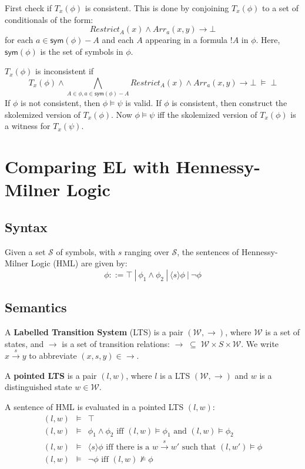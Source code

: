 \documentclass[smallextended]{svjour3}       %
\numberwithin{subcase}{mycase}
\def\fOr {\ | \ }
\begin{document}
First check if $T_x(\phi)$ is consistent.
This is done by conjoining $T_x(\phi)$ to a set of conditionals of the form:
\[
Restrict_A(x) \land Arr_a(x,y) \rightarrow \bot
\]
for each $a \in \mathsf{sym}(\phi)-A$ and each $A$ appearing in a formula $!A$ in $\phi$.
Here, $\mathsf{sym}(\phi)$ is the set of symbols in $\phi$.

$T_x(\phi)$ is inconsistent if 
\[
T_x(\phi) \land \bigwedge_{A \in \phi, a \in\mathsf{sym}(\phi)-A} Restrict_A(x) \land Arr_a(x,y) \rightarrow \bot \; \models \; \bot
\]
If $\phi$ is not consistent, then $\phi \models \psi$ is valid.
If $\phi$ is consistent, then construct the skolemized version of $T_x(\phi)$. 
Now $\phi \models \psi$ iff the skolemized version of  $T_x(\phi)$ is a witness for $T_x(\psi)$. 

\section{Comparing EL with Hennessy-Milner Logic}
\subsection{Syntax}
Given a set $\mathcal{S}$ of symbols, with $s$ ranging over $\mathcal{S}$, the sentences of Hennessy-Milner Logic (HML) are given by:
\[
\phi ::= \top \fOr \phi_1 \land \phi_2 \fOr \langle s \rangle \phi \fOr \neg \phi 
\]
\subsection{Semantics}
A {\bf Labelled Transition System} (LTS) is a pair $(\mathcal{W}, \rightarrow)$, where $\mathcal{W}$ is a set of states, and $\rightarrow$ is a set of transition relations: $\rightarrow \; \subseteq \; \mathcal{W} \times S \times \mathcal{W}$.
We write $x \xrightarrow{s} y$ to abbreviate $(x,s,y) \in \rightarrow$.

A {\bf pointed LTS} is a pair $(l, w)$, where $l$ is a LTS $(\mathcal{W}, \rightarrow)$ and $w$ is a distinguished state $w \in \mathcal{W}$.

A sentence of HML is evaluated in a pointed LTS $(l, w)$:
\begin{eqnarray}
(l,w) & \models & \top \nonumber \\
(l,w) & \models & \phi_1 \land \phi_2 \mbox{ iff } (l,w)  \models \phi_1 \mbox { and } (l,w) \models \phi_2 \nonumber \\
(l,w) & \models & \langle s \rangle \phi \mbox{ iff there is a } w \xrightarrow{s} w' \mbox { such that } (l,w') \models \phi \nonumber \\
(l,w) & \models & \neg \phi \mbox{ iff } (l,w)  \nvDash \phi \nonumber
\end{eqnarray}
\end{document}
